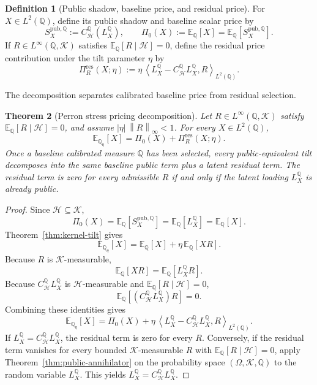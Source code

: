 \documentclass[11pt,a4paper]{amsart}
\theoremstyle{plain}
\newtheorem{theorem}{Theorem}[section]
\theoremstyle{definition}
\newtheorem{definition}[theorem]{Definition}
\theoremstyle{remark}
\newcommand{\QQ}{\mathbb{Q}}
\newcommand{\EE}{\mathbb{E}}
\newcommand{\cH}{\mathcal{H}}
\newcommand{\cK}{\mathcal{K}}
\newcommand{\norm}[1]{\left\lVert #1\right\rVert}
\newcommand{\ip}[2]{\left\langle #1,#2\right\rangle}
\begin{document}
\begin{definition}[Public shadow, baseline price, and residual price]\label{def:pricing-decomposition}
For \(X\in L^2(\QQ)\), define its public shadow and baseline scalar price by
\[
        S_X^{\mathrm{pub},\QQ}
        :=
        C_{\cH}^{\QQ}(L_X^\QQ),
        \qquad
        \Pi_0(X)
        :=
        \EE_\QQ[X]
        =
        \EE_\QQ[S_X^{\mathrm{pub},\QQ}].
\]
If \(R\in L^\infty(\QQ,\cK)\) satisfies \(\EE_\QQ[R\mid\cH]=0\), define the residual price
contribution under the tilt parameter \(\eta\) by
\[
        \Pi_R^{\mathrm{res}}(X;\eta)
        :=
        \eta\,
        \ip{L_X^\QQ-C_{\cH}^{\QQ}L_X^\QQ}{R}_{L^2(\QQ)}.
\]
\end{definition}

The decomposition separates calibrated baseline price from residual selection.

\begin{theorem}[Perron stress pricing decomposition]\label{thm:pricing-decomposition}
Let \(R\in L^\infty(\QQ,\cK)\) satisfy \(\EE_\QQ[R\mid\cH]=0\), and assume
\(|\eta|\,\norm{R}_\infty<1\).  For every \(X\in L^2(\QQ)\),
\[
        \EE_{\QQ_\eta}[X]
        =
        \Pi_0(X)
        +
        \Pi_R^{\mathrm{res}}(X;\eta).
\]
Once a baseline calibrated measure \(\QQ\) has been selected, every public-equivalent tilt
decomposes into the same baseline public term plus a latent residual term.  The residual term is
zero for every admissible \(R\) if and only if the latent loading \(L_X^\QQ\) is already public.
\end{theorem}

\begin{proof}
Since \(\cH\subseteq\cK\),
\[
        \Pi_0(X)
        =
        \EE_\QQ[S_X^{\mathrm{pub},\QQ}]
        =
        \EE_\QQ[L_X^\QQ]
        =
        \EE_\QQ[X].
\]
Theorem~\ref{thm:kernel-tilt} gives
\[
        \EE_{\QQ_\eta}[X]
        =
        \EE_\QQ[X]+\eta\,\EE_\QQ[XR].
\]
Because \(R\) is \(\cK\)-measurable,
\[
        \EE_\QQ[XR]=\EE_\QQ[L_X^\QQ R].
\]
Because \(C_{\cH}^{\QQ}L_X^\QQ\) is \(\cH\)-measurable and \(\EE_\QQ[R\mid\cH]=0\),
\[
        \EE_\QQ[(C_{\cH}^{\QQ}L_X^\QQ)R]=0.
\]
Combining these identities gives
\[
        \EE_{\QQ_\eta}[X]
        =
        \Pi_0(X)
        +
        \eta\,\ip{L_X^\QQ-C_{\cH}^{\QQ}L_X^\QQ}{R}_{L^2(\QQ)}.
\]
If \(L_X^\QQ=C_{\cH}^{\QQ}L_X^\QQ\), the residual term is zero for every \(R\).  Conversely, if the
residual term vanishes for every bounded \(\cK\)-measurable \(R\) with
\(\EE_\QQ[R\mid\cH]=0\), apply Theorem~\ref{thm:public-annihilator} on the probability space
\((\Omega,\cK,\QQ)\) to the random variable \(L_X^\QQ\).  This yields
\(L_X^\QQ=C_{\cH}^{\QQ}L_X^\QQ\).
\end{proof}
\end{document}
